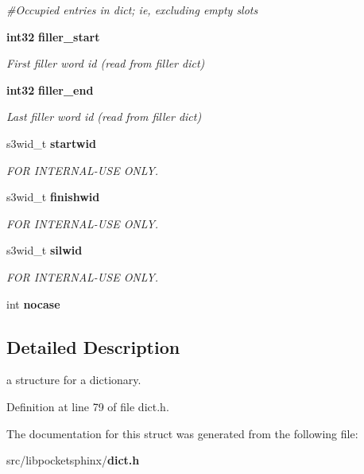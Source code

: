 \begin{DoxyCompactItemize}
\begin{DoxyCompactList}\small\item\em \#\-Occupied entries in dict; ie, excluding empty slots \end{DoxyCompactList}\item 
{\bf int32} {\bf filler\-\_\-start}\label{structdict__t_abd48fdafaaa68a8df2fd82163c51a95c}

\begin{DoxyCompactList}\small\item\em \-First filler word id (read from filler dict) \end{DoxyCompactList}\item 
{\bf int32} {\bf filler\-\_\-end}\label{structdict__t_a77c6692e56308968804add1292275cb7}

\begin{DoxyCompactList}\small\item\em \-Last filler word id (read from filler dict) \end{DoxyCompactList}\item 
s3wid\-\_\-t {\bf startwid}\label{structdict__t_a22bc6c52ce9e04c4f3f7d0ba1972ee51}

\begin{DoxyCompactList}\small\item\em \-F\-O\-R \-I\-N\-T\-E\-R\-N\-A\-L-\/\-U\-S\-E \-O\-N\-L\-Y. \end{DoxyCompactList}\item 
s3wid\-\_\-t {\bf finishwid}\label{structdict__t_a3875be5336e2d9888f6d5cb83ded82c5}

\begin{DoxyCompactList}\small\item\em \-F\-O\-R \-I\-N\-T\-E\-R\-N\-A\-L-\/\-U\-S\-E \-O\-N\-L\-Y. \end{DoxyCompactList}\item 
s3wid\-\_\-t {\bf silwid}\label{structdict__t_aad07b22b94c360923f151c02890f6e68}

\begin{DoxyCompactList}\small\item\em \-F\-O\-R \-I\-N\-T\-E\-R\-N\-A\-L-\/\-U\-S\-E \-O\-N\-L\-Y. \end{DoxyCompactList}\item 
int {\bfseries nocase}\label{structdict__t_a2240400afe39fbee593ff7e33f97008c}

\end{DoxyCompactItemize}


\subsection{\-Detailed \-Description}
a structure for a dictionary. 

\-Definition at line 79 of file dict.\-h.



\-The documentation for this struct was generated from the following file\-:\begin{DoxyCompactItemize}
\item 
src/libpocketsphinx/{\bf dict.\-h}\end{DoxyCompactItemize}
